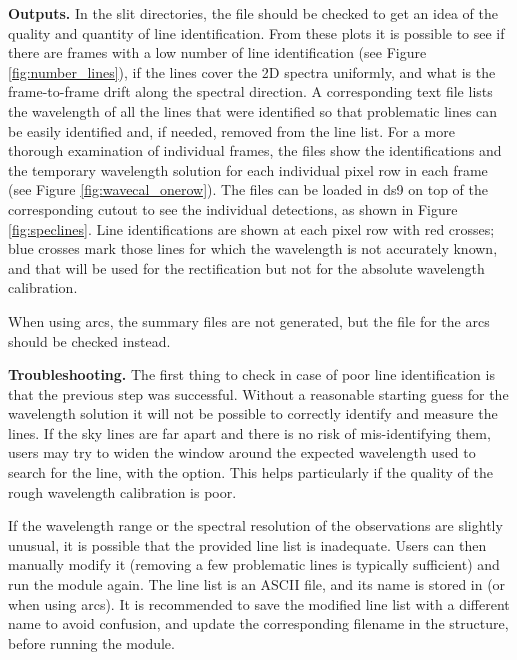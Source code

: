 \documentclass[a4paper]{article}
\begin{document}
\begin{sloppypar}
\medskip
\noindent
\textbf{Outputs.} In the slit directories, the file  should be checked to get an idea of the quality and quantity of line identification. From these plots it is possible to see if there are frames with a low number of line identification (see Figure \ref{fig:number_lines}), if the lines cover the 2D spectra uniformly, and what is the frame-to-frame drift along the spectral direction. A corresponding text file lists the wavelength of all the lines that were identified so that problematic lines can be easily identified and, if needed, removed from the line list. For a more thorough examination of individual frames, the  files show the identifications and the temporary wavelength solution for each individual pixel row in each frame (see Figure \ref{fig:wavecal_onerow}). The  files can be loaded in ds9 on top of the corresponding cutout to see the individual detections, as shown in Figure \ref{fig:speclines}. Line identifications are shown at each pixel row with red crosses; blue crosses mark those lines for which the wavelength is not accurately known, and that will be used for the rectification but not for the absolute wavelength calibration.

When using arcs, the summary files are not generated, but the  file for the arcs should be checked instead.

\medskip
\noindent
\textbf{Troubleshooting.} The first thing to check in case of poor line identification is that the previous step was successful. Without a reasonable starting guess for the wavelength solution it will not be possible to correctly identify and measure the lines. If the sky lines are far apart and there is no risk of mis-identifying them, users may try to widen the window around the expected wavelength used to search for the line, with the  option. This helps particularly if the quality of the rough wavelength calibration is poor.

If the wavelength range or the spectral resolution of the observations are slightly unusual, it is possible that the provided line list is inadequate. Users can then manually modify it (removing a few problematic lines is typically sufficient) and run the  module again. The line list is an ASCII file, and its name is stored in  (or  when using arcs). It is recommended to save the modified line list with a different name to avoid confusion, and update the corresponding filename in the  structure, before running the module.


\end{sloppypar}
\end{document}
